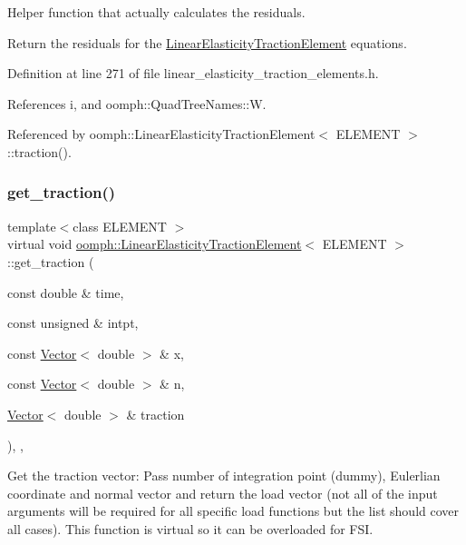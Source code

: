 Helper function that actually calculates the residuals. 

Return the residuals for the \hyperlink{classoomph_1_1LinearElasticityTractionElement}{Linear\+Elasticity\+Traction\+Element} equations. 

Definition at line 271 of file linear\+\_\+elasticity\+\_\+traction\+\_\+elements.\+h.



References i, and oomph\+::\+Quad\+Tree\+Names\+::W.



Referenced by oomph\+::\+Linear\+Elasticity\+Traction\+Element$<$ E\+L\+E\+M\+E\+N\+T $>$\+::traction().

\mbox{\label{classoomph_1_1LinearElasticityTractionElement_aa6cf9c9f8a36d2a32d56723b081f2079}} 
\subsubsection{\texorpdfstring{get\+\_\+traction()}{get\_traction()}}
{\footnotesize\ttfamily template$<$class E\+L\+E\+M\+E\+NT $>$ \\
virtual void \hyperlink{classoomph_1_1LinearElasticityTractionElement}{oomph\+::\+Linear\+Elasticity\+Traction\+Element}$<$ E\+L\+E\+M\+E\+NT $>$\+::get\+\_\+traction (\begin{DoxyParamCaption}\item[{const double \&}]{time,  }\item[{const unsigned \&}]{intpt,  }\item[{const \hyperlink{classoomph_1_1Vector}{Vector}$<$ double $>$ \&}]{x,  }\item[{const \hyperlink{classoomph_1_1Vector}{Vector}$<$ double $>$ \&}]{n,  }\item[{\hyperlink{classoomph_1_1Vector}{Vector}$<$ double $>$ \&}]{traction }\end{DoxyParamCaption})\hspace{0.3cm}{\ttfamily [inline]}, {\ttfamily [protected]}, {\ttfamily [virtual]}}



Get the traction vector\+: Pass number of integration point (dummy), Eulerlian coordinate and normal vector and return the load vector (not all of the input arguments will be required for all specific load functions but the list should cover all cases). This function is virtual so it can be overloaded for F\+SI. 




